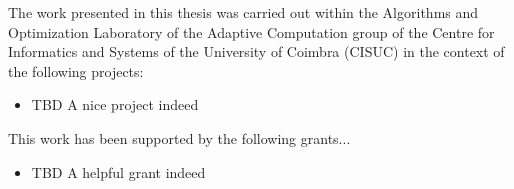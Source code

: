 \thispagestyle{empty}

\vspace*{\fill}

The work presented in this thesis was carried out within the Algorithms and Optimization Laboratory of the Adaptive Computation group of the Centre for Informatics and Systems of the University of Coimbra (CISUC) in the context of the following projects:

\begin{itemize}
    \item{TBD} A nice project indeed
\end{itemize}

This work has been supported by the following grants...

\begin{itemize}
    \item{TBD} A helpful grant indeed
\end{itemize}
\vspace*{\fill}


